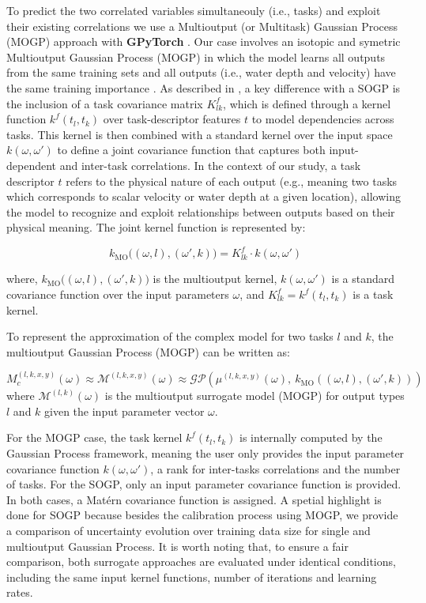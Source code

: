 \documentclass[draft,linenumbers,onecolumn]{agujournal2019} %
\begin{document}
To predict the two correlated variables simultaneouly (i.e., tasks) and exploit their existing correlations we use a Multioutput (or Multitask) Gaussian Process (MOGP) approach with \textbf{GPyTorch} \cite{gardner2018gpytorch}. Our case involves an isotopic and symetric Multioutput Gaussian Process (MOGP) in which the model learns all outputs from the same training sets and all outputs (i.e., water depth and velocity) have the same training importance \cite{liu2018remarks}. As described in , a key difference with a SOGP is the inclusion of a task covariance matrix \( K_{lk}^{f} \), which is defined through a kernel function \( k^{f}{(t_l, t_k)} \) over task-descriptor features \( t \) to model dependencies across tasks. This kernel is then combined with a standard kernel over the input space \(k(\omega, \omega')\) to define a joint covariance function that captures both input-dependent and inter-task correlations. In the context of our study, a task descriptor \( t \) refers to the physical nature of each output (e.g., meaning two tasks which corresponds to scalar velocity or water depth at a given location), allowing the model to recognize and exploit relationships between outputs based on their physical meaning. The joint kernel function is represented by: 

\[
 k_{\text{MO}}\big((\omega, l), (\omega', k)\big) =  K_{lk}^{f} \cdot k(\omega, \omega')
\]

where, \( k_{\text{MO}}\big((\omega, l), (\omega', k)\big) \) is the multioutput kernel, \( k(\omega, \omega') \) is a standard covariance function over the input parameters \( \omega \), and  \( K_{lk}^{f} = k^{f}{(t_l, t_k)} \) is a task kernel.

To represent the approximation of the complex model for two tasks \( l \) and \( k \), the multioutput Gaussian Process (MOGP) can be written as:

\[
M_c^{(l,k,x,y)}(\omega) \approx \mathcal{M}^{(l,k,x,y)}(\omega) \approx \mathcal{GP}\left(\mu^{(l,k,x,y)}(\omega),\ k_{\text{MO}}\left((\omega, l), (\omega', k)\right)\right)
\]
where \( \mathcal{M}^{(l,k)}(\omega) \) is the multioutput surrogate model (MOGP) for output types \( l \) and \( k \) given the input parameter vector \( \omega \).


For the MOGP case, the task kernel \( k^{f}{(t_l, t_k)} \) is internally computed by the Gaussian Process framework, meaning the user only provides the input parameter covariance function \( k(\omega, \omega') \), a rank for inter-tasks correlations and the number of tasks. For the SOGP, only an input parameter covariance function is provided. In both cases, a Matérn covariance function is assigned. A spetial highlight is done for SOGP because besides the calibration process using MOGP, we provide a comparison of uncertainty evolution over training data size for single and multioutput Gaussian Process. It is worth noting that, to ensure a fair comparison, both surrogate approaches are evaluated under identical conditions, including the same input kernel functions, number of iterations and learning rates.
\end{document}
